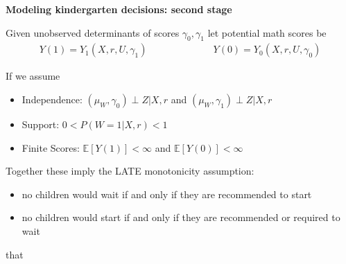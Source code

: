 \documentclass[t,aspectratio=169,11pt,presentation]{beamer}
\newenvironment{wideitemize}{\itemize\addtolength{\itemsep}{14pt}}{\enditemize}
\begin{document}
\begin{frame}[label=model2]{\textbf{Modeling kindergarten decisions: second stage}}

\begin{wideitemize}
  \item Given unobserved determinants of scores $\gamma_0,\gamma_1$ let potential math scores be
\begin{align*}
    Y(1)=Y_1(X,r,U,\gamma_1) \hspace{3em}&\hspace{3em}    Y(0)=Y_0(X,r,U,\gamma_0)
\end{align*}

\item<2-> If we assume 
\begin{itemize}
    \item Independence:  $(\mu_W,\gamma_0) \perp Z|X,r $ and $(\mu_W,\gamma_1) \perp Z|X,r $
    \item Support: $0<P(W=1|X,r)<1$ %
    \item Finite Scores: $\mathbb{E}[Y(1)]<\infty$ and $\mathbb{E}[Y(0)]<\infty$
\end{itemize}

\item<2-> Together these imply the LATE monotonicity assumption:
\begin{itemize}
    \item no children would wait if and only if they are recommended to start
    \item no children would start if and only if they are recommended or required to wait
\end{itemize}that


\end{wideitemize}

\vfill 

\hyperlink{wait2}{}   
\end{frame}


\end{document}
